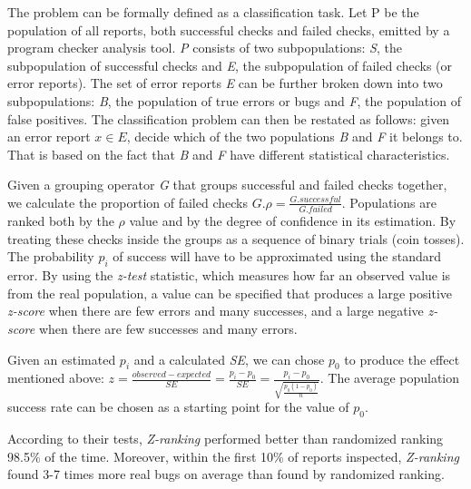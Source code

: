  The problem can be formally defined as a classification task. Let P be the population of all reports, both successful checks and failed checks, emitted by a program checker analysis tool. \textit{P} consists of two subpopulations: \textit{S}, the subpopulation of successful checks and \textit{E}, the subpopulation of failed checks (or error reports). The set of error reports \textit{E} can be further broken down into two subpopulations: \textit{B}, the population of true errors or bugs and \textit{F}, the population of false positives. The classification problem can then be restated as follows: given an error report $x \in E$, decide which of the two populations \textit{B} and \textit{F} it belongs to. That is based on the fact that \textit{B} and \textit{F} have different statistical characteristics. 

 Given a grouping operator \textit{G} that groups successful and failed checks together, we calculate the proportion of failed checks $G.\rho = \frac{G.successful}{G.failed}$. Populations are ranked both by the $\rho$ value and by the degree of confidence in its estimation. By treating these checks inside the groups as a sequence of binary trials (coin tosses). The probability $p_i$ of success will have to be approximated using the standard error. By using the \textit{z-test} statistic, which measures how far an observed value is from the real population, a value can be specified that produces a large positive \textit{z-score} when there are few errors and many successes, and a large negative \textit{z-score} when there are few successes and many errors.

 Given an estimated $p_i$ and a calculated \textit{SE}, we can chose $p_0$ to produce the effect mentioned above:
 $z=\frac{observed-expected}{SE}=\frac{p_i-p_0}{SE}=\frac{p_i-p_0}{\sqrt{\frac{p_0(1-p_0)}{n}}}$. The average population success rate can be chosen as a starting point for the value of $p_0$.

 According to their tests, \textit{Z-ranking} performed better than randomized ranking 98.5\% of the time. Moreover, within the first 10\% of reports inspected, \textit{Z-ranking} found 3-7 times more real bugs on average than found by randomized ranking.\\

